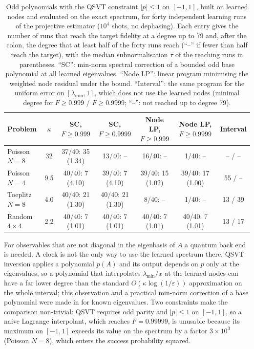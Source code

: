 \documentclass[journal]{IEEEtran}
\newcommand{\lmin}{\lambda_{\min}}
\begin{document}
\begin{table}[t]
\caption{Odd polynomials with the QSVT constraint $|p|\le1$ on $[-1,1]$, built on learned nodes and evaluated on the exact spectrum, for forty independent learning runs of the projective estimator ($10^4$ shots, no dephasing). Each entry gives the number of runs that reach the target fidelity at a degree up to 79 and, after the colon, the degree that at least half of the forty runs reach (``--'' if fewer than half reach the target), with the median subnormalisation $\tau$ of the reaching runs in parentheses. ``SC'': min-norm spectral correction \cite{Suresh2026} of a bounded odd base polynomial at all learned eigenvalues. ``Node LP'': linear program minimising the weighted node residual under the bound. ``Interval'': the same program for the uniform error on $[\lmin,1]$, which does not use the learned nodes (minimal degree for $F\ge0.999$ / $F\ge0.9999$; ``--'': not reached up to degree 79).}
\label{tab:poly}
\centering\footnotesize
\begin{tabular}{lcccccc}
\toprule
Problem & $\kappa$ & SC, $F\ge0.999$ & SC, $F\ge0.9999$ & Node LP, $F\ge0.999$ & Node LP, $F\ge0.9999$ & Interval\\
\midrule
Poisson $N=8$ & 32 & 37/40: 35 (1.34) & 13/40: -- & 16/40: -- & 1/40: -- & -- / --\\
Poisson $N=4$ & 9.5 & 40/40: 7 (4.10) & 39/40: 7 (4.10) & 39/40: 15 (1.02) & 39/40: 17 (1.00) & 55 / --\\
Toeplitz $N=8$ & 4.0 & 40/40: 21 (1.30) & 40/40: 21 (1.30) & 8/40: -- & 1/40: -- & 13 / 39\\
Random $4\times4$ & 2.2 & 40/40: 7 (1.01) & 40/40: 7 (1.01) & 40/40: 7 (1.01) & 40/40: 7 (1.01) & 13 / 17\\
\bottomrule
\end{tabular}
\end{table}

For observables that are not diagonal in the eigenbasis of $A$ a quantum back end is needed. A clock is not the only way to use the learned spectrum there. QSVT inversion \cite{Gilyen2019,Martyn2021} applies a polynomial $p(A)$ and its output depends on $p$ only at the eigenvalues, so a polynomial that interpolates $\lmin/x$ at the learned nodes can have a far lower degree than the standard $O(\kappa\log(1/\varepsilon))$ approximation on the whole interval; this observation and a practical min-norm correction of a base polynomial were made in \cite{Suresh2026} for known eigenvalues. Two constraints make the comparison non-trivial: QSVT requires odd parity and $|p|\le1$ on $[-1,1]$, so a naive Lagrange interpolant, which reaches $F=0.99999$, is unusable because its maximum on $[-1,1]$ exceeds its value on the spectrum by a factor $3\times10^3$ (Poisson $N=8$), which enters the success probability squared.
\end{document}
